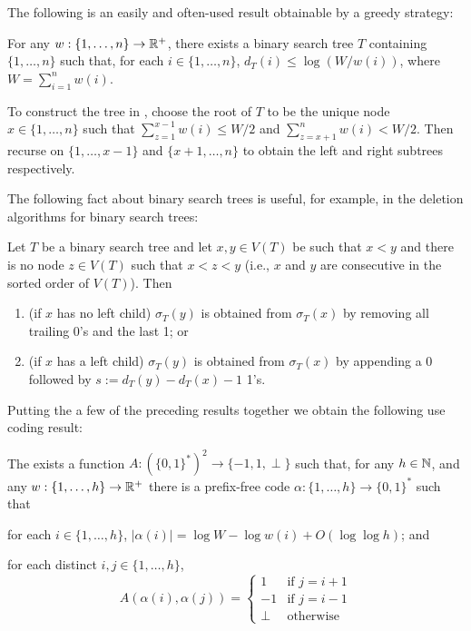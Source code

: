 \documentclass[kpfonts]{patmorin}
\begin{document}
The following is an easily and often-used result obtainable by a greedy strategy: 

\begin{lem}
  For any $w:\{1,\ldots,n\}\to\mathbb{R}^+$, there exists a binary search tree $T$ containing $\{1,\ldots,n\}$ such that, for each $i\in\{1,\ldots,n\}$, $d_T(i)\le\log(W/w(i))$, where $W=\sum_{i=1}^n w(i)$.
\end{lem}

To construct the tree in , choose the root of $T$ to be the unique node $x\in\{1,\ldots,n\}$ such that $\sum_{z=1}^{x-1} w(i)\le W/2$ and $\sum_{z=x+1}^{n} w(i)< W/2$.  Then recurse on $\{1,\ldots,x-1\}$ and $\{x+1,\ldots,n\}$ to obtain the left and right subtrees respectively.

The following fact about binary search trees is useful, for example, in the deletion algorithms for binary search trees:

\begin{lem}
  Let $T$ be a binary search tree and let $x,y\in V(T)$ be such that $x<y$ and there is no node $z\in V(T)$ such that $x<z<y$ (i.e., $x$ and $y$ are consecutive in the sorted order of $V(T)$).  Then
  \begin{enumerate}
    \item (if $x$ has no left child) $\sigma_T(y)$ is obtained from $\sigma_T(x)$ by removing all trailing 0's and the last 1; or
    \item (if $x$ has a left child) $\sigma_T(y)$ is obtained from $\sigma_T(x)$ by appending a 0 followed by $s:=d_T(y)-d_T(x)-1$ 1's.
  \end{enumerate}
\end{lem}

Putting the a few of the preceding results together we obtain the following use coding result:

\begin{lem}
  The exists a function $A:(\{0,1\}^*)^2\to\{-1,1,\perp\}$ such that, for any $h\in\mathbb{N}$, and any $w:\{1,\ldots,h\}\to\mathbb{R}^+$ there is a prefix-free code $\alpha:\{1,\ldots,h\}\to \{0,1\}^*$ such that 
  \begin{compactenum}
    \item for each $i\in\{1,\ldots,h\}$, $|\alpha(i)|=\log W -\log w(i) + O(\log\log h)$; and
    \item for each distinct $i,j\in\{1,\ldots,h\}$, 
    \[   A(\alpha(i),\alpha(j)) 
    = \begin{cases}
       1 & \text{if $j=i+1$} \\
       -1 & \text{if $j=i-1$} \\
       \perp & \text{otherwise}
      \end{cases}
      \]
    \end{compactenum}
\end{lem}
\end{document}
